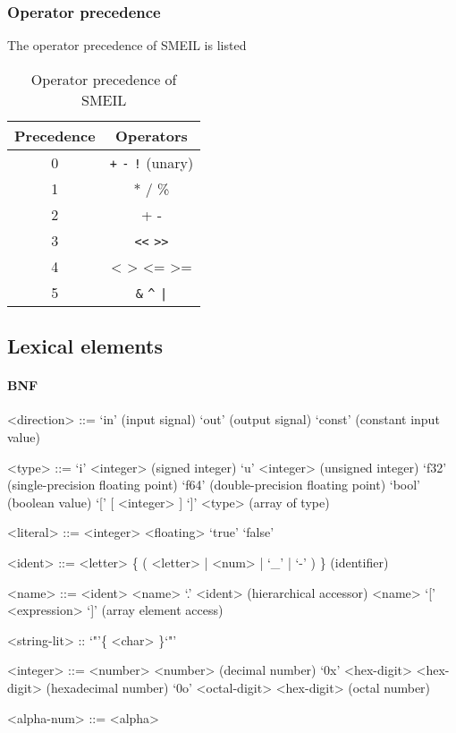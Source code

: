 \documentclass{article}
\begin{document}
\subsubsection{Operator precedence}

The operator precedence of SMEIL is listed 

\begin{table}[H]
  \centering
\begin{tabular}{cc}
  \toprule
  \textbf{Precedence} & \textbf{Operators}\\
  \midrule
  0 & \verb!+! \verb!-! \verb|!| (unary)\\
  1 & * / \% \\
  2 & + - \\
  3 & \verb!<<! \verb!>>! \\
  4 & < > <= >= \\
  5 & \verb!&! \verb!^! \verb!|! \\
  \bottomrule
\end{tabular}
\caption{Operator precedence of SMEIL}
\label{tab:ops}
\end{table}

\subsection{Lexical elements}
\paragraph{BNF}
\begin{grammar}

  <direction> ::= `in' (input signal)
  \alt `out' (output signal)
  \alt `const' (constant input value)

  <type> ::= `i' <integer> (signed integer)
  \alt `u' <integer> (unsigned integer)
  \alt `f32' (single-precision floating point)
  \alt `f64' (double-precision floating point)
  \alt `bool' (boolean value)
  \alt `[' [ <integer> ] `]' <type> (array of type)


  <literal> ::= <integer>
  \alt <floating>
  \alt `true'
  \alt `false'

  <ident> ::= <letter> \{ ( <letter> | <num> | `_' | `-' ) \} (identifier)

  <name> ::= <ident>
  \alt <name> `.' <ident> (hierarchical accessor)
  \alt <name> `[' <expression> `]' (array element access)

  <string-lit> :: `"'\{ <char> \}`"'

  <integer> ::= <number> { <number> } (decimal number)
  \alt `0x' <hex-digit> { <hex-digit> } (hexadecimal number)
  \alt `0o' <octal-digit> { <hex-digit> } (octal number)

  <alpha-num> ::= <alpha>

\end{grammar}
\end{document}
